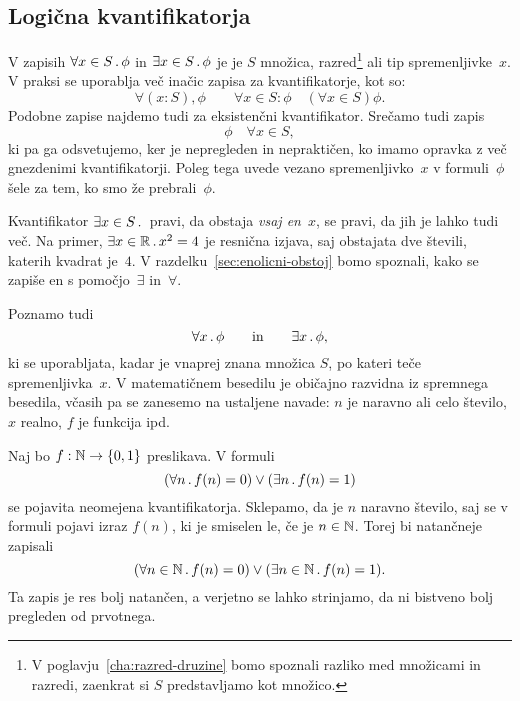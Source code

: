 \subsection{Logična kvantifikatorja}
\label{sec:logina-kvant}

V zapisih $\forall x \in S \,.\, \phi$ in $\exists x \in S \,.\, \phi$ je je $S$ množica, razred\footnote{V poglavju~\ref{cha:razred-druzine} bomo spoznali razliko med množicami in razredi, zaenkrat si $S$
  predstavljamo kot množico.} ali tip spremenljivke~$x$. V praksi se
uporablja več inačic zapisa za kvantifikatorje, kot so:
%
\begin{equation*}
  \forall (x : S) , \phi
  \qquad
  \forall x \in S : \phi
  \quad
  (\forall x \in S) \phi.
\end{equation*}
%
Podobne zapise najdemo tudi za eksistenčni kvantifikator.
%
Srečamo tudi zapis
%
\begin{equation*}
  \phi\quad \forall x \in S,
\end{equation*}
%
ki pa ga odsvetujemo, ker je nepregleden in nepraktičen, ko imamo opravka z več gnezdenimi kvantifikatorji.
%
Poleg tega uvede vezano spremenljivko~$x$ v formuli~$\phi$ šele za tem, ko smo že prebrali~$\phi$.

Kvantifikator $\exists x \in S \,.\,$ pravi, da obstaja \emph{vsaj en}~$x$, se pravi, da jih je lahko tudi več.
Na primer, $\exists x \in \mathbb{R} \,.\, x^2 = 4$ je resnična izjava, saj obstajata dve števili, katerih kvadrat je~$4$.
%
V razdelku~\ref{sec:enolicni-obstoj} bomo spoznali, kako se zapiše  en s pomočjo~$\exists$ in~$\forall$.

Poznamo tudi  
%
\begin{equation*}
  \forall x \,.\, \phi
  \qquad\text{in}\qquad
  \exists x \,.\, \phi,
\end{equation*}
%
ki se uporabljata, kadar je vnaprej znana množica $S$,
po kateri teče spremenljivka~$x$. V matematičnem besedilu je običajno
razvidna iz spremnega besedila, včasih pa se zanesemo na ustaljene navade:
$n$ je naravno ali celo število, $x$ realno, $f$ je funkcija ipd.

\begin{zgled}
  Naj bo $f : \mathbb{N} \to \left\{0, 1\right\}$ preslikava. V formuli
  \begin{equation*}
    (\forall n \,.\, f(n) = 0) \lor (\exists n \,.\, f(n) = 1)
  \end{equation*}
  se pojavita neomejena kvantifikatorja. Sklepamo, da je $n$ naravno število, saj se v formuli pojavi izraz $f(n)$,
  ki je smiselen le, če je $n \in \mathbb{N}$. Torej bi natančneje zapisali
  \begin{equation*}
    (\forall n \in \mathbb{N} \,.\, f(n) = 0) \lor (\exists n \in \mathbb{N} \,.\, f(n) = 1).
  \end{equation*}
  Ta zapis je res bolj natančen, a verjetno se lahko strinjamo, da ni bistveno bolj pregleden od prvotnega.
\end{zgled}

